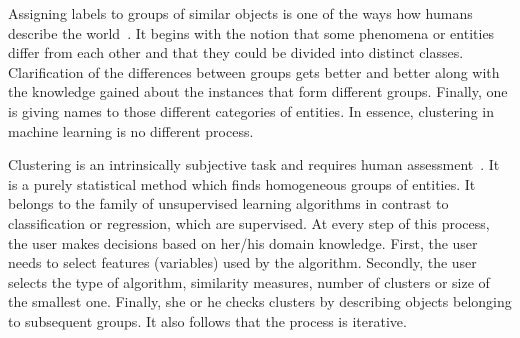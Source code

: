 \documentclass{article}
\begin{document}
Assigning labels to groups of similar objects is one of the ways how humans describe the world~\cite{Rosch1978-ROSCAC-5}.
It begins with the notion that some phenomena or entities differ from each other and that they could be divided into distinct classes.
Clarification of the differences between groups gets better and better along with the knowledge gained about the instances that form different groups.
Finally, one is giving names to those different categories of entities. %
In essence, clustering in machine learning is no different process.

Clustering is an intrinsically subjective task and requires human assessment~\cite{10.1145/3340960}.
It is a purely statistical method which finds homogeneous groups of entities.
It belongs to the family of unsupervised learning algorithms in contrast to classification or regression, which are supervised.
At every step of this process, the user makes decisions based on her/his domain knowledge.
First, the user needs to select features (variables) used by the algorithm.
Secondly, the user selects the type of algorithm, similarity measures, number of clusters or size of the smallest one.
Finally, she or he checks clusters by describing objects belonging to subsequent groups.
It also follows that the process is iterative.
\end{document}

